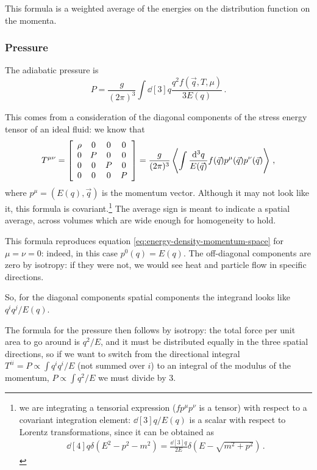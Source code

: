 \documentclass[main.tex]{subfiles}
\begin{document}
This formula is a weighted average of the energies on the distribution function on the momenta. 

\subsubsection{Pressure}

The adiabatic pressure is 
%
\begin{equation}\label{eq:pressure-momentum-space}
  P = \frac{g}{(2 \pi )^3} \int \dd[3]{q} \frac{q^2 f(\vec{q}, T, \mu )}{3E(q)} 
\,.
\end{equation}

\begin{bluebox}  
This comes from a consideration of the diagonal components of the stress energy tensor of an ideal fluid: we know that 
%
\begin{align}
T^{\mu \nu }
= \left[\begin{array}{cccc}
\rho  & 0 & 0 & 0 \\ 
0 & P & 0 & 0 \\ 
0 & 0 & P & 0 \\ 
0 & 0 & 0 & P
\end{array}\right]
= \frac{g}{(2\pi )^3} \expval{ \int \frac{\dd[3]{q}}{E(\vec{q})} f(\vec{q}) p^{\mu } (\vec{q}) p^{\nu } (\vec{q})}
\,,
\end{align}
%
where \(p^{\mu } = (E(q), \vec{q})\) is the momentum vector.
Although it may not look like it, this formula is covariant.\footnote{we are integrating a tensorial expression (\(f p^{\mu } p^{\nu }\) is a tensor) with respect to a covariant integration element: \(\dd[3]{q} / E(q)\) is a scalar with respect to Lorentz transformations, since it can be obtained as 
%
\begin{align}
\dd[4]{q} \delta (E^2 - p^2 - m^2) = \frac{ \dd[3]{q}}{2E} \delta (E - \sqrt{m^2+p^2})
\,.
\end{align}
}
The average sign is meant to indicate a spatial average, across volumes which are wide enough for homogeneity to hold. 

This formula reproduces equation \eqref{eq:energy-density-momentum-space} for \(\mu = \nu = 0\): indeed, in this case \(p^{0} (q) = E(q)\).
The off-diagonal components are zero by isotropy: if they were not, we would see heat and particle flow in specific directions. 

So, for the diagonal components spatial components the integrand looks like \(q^{i} q^{j} / E(q)\). 

The formula for the pressure then follows by isotropy: the total force per unit area to go around is \(q^2 / E\), and it must be distributed equally in the three spatial directions, so if we want to switch from the directional integral \(T^{ii} = P \propto \int q^{i} q^{i} / E\) (not summed over \(i\)) to an integral of the modulus of the momentum, \(P \propto \int q^2 / E\) we must divide by 3. 
\end{bluebox}
\end{document}
